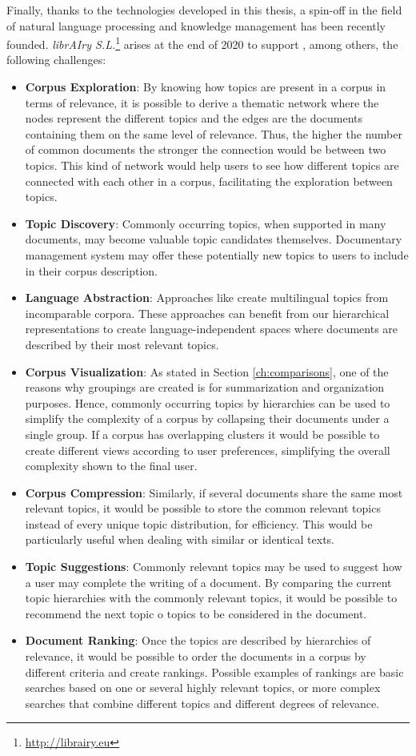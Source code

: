 Finally, thanks to the technologies developed in this thesis, a spin-off in the field of natural language processing and knowledge management has been recently founded. \textit{librAIry S.L.}\footnote{\url{http://librairy.eu}} arises at the end of 2020 to support , among others, the following challenges:
\begin{itemize}
\item \textbf{Corpus Exploration}: By knowing how topics are present in a corpus in terms of relevance, it is possible to derive a thematic network where the nodes represent the different topics and the edges are the documents containing them on the same level of relevance. Thus, the higher the number of common documents the stronger the connection would be between two topics. This kind of network would help users to see how different topics are connected with each other in a corpus, facilitating the exploration between topics.
\item \textbf{Topic Discovery}: Commonly occurring topics, when supported in many documents, may become valuable topic candidates themselves. Documentary management system may offer these potentially new topics to users to include in their corpus description.
\item \textbf{Language Abstraction}: Approaches like \citep{hao-paul-2018-learning} create multilingual topics from incomparable corpora. These approaches can benefit from our hierarchical representations to create language-independent spaces where documents are described by their most relevant topics.
\item \textbf{Corpus Visualization}: As stated in Section \ref{ch:comparisons}, one of the reasons why groupings are created is for summarization and organization purposes. Hence, commonly occurring topics by hierarchies can be used to simplify the complexity of a corpus by collapsing their documents under a single group. If a corpus has overlapping clusters it would be possible to create different views according to user preferences, simplifying the overall complexity shown to the final user.
\item \textbf{Corpus Compression}: Similarly, if several documents share the same most relevant topics, it would be possible to store the common relevant topics instead of every unique topic distribution, for efficiency. This would be particularly useful when dealing with similar or identical texts.
\item \textbf{Topic Suggestions}: Commonly relevant topics may be used to suggest how a user may complete the writing of a document. By comparing the current topic hierarchies with the commonly relevant topics, it would be possible to recommend the next topic o topics to be considered in the document.
\item \textbf{Document Ranking}: Once the topics are described by hierarchies of relevance, it would be possible to order the documents in a corpus by different criteria and create rankings. Possible examples of rankings are basic searches based on one or several highly relevant topics, or more complex searches that combine different topics and different degrees of relevance.  
\end{itemize}


